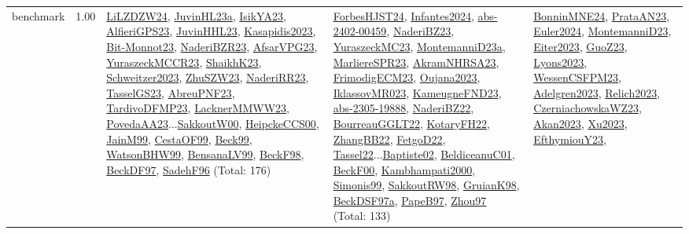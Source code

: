{\begin{longtable}{p{3cm}r>{\raggedright\arraybackslash}p{6cm}>{\raggedright\arraybackslash}p{6cm}>{\raggedright\arraybackslash}p{8cm}}
\index{benchmark}\index{Benchmarks!benchmark}benchmark &  1.00 & \hyperref[detail:LiLZDZW24]{LiLZDZW24}, \hyperref[detail:JuvinHL23a]{JuvinHL23a}, \hyperref[detail:IsikYA23]{IsikYA23}, \hyperref[detail:AlfieriGPS23]{AlfieriGPS23}, \hyperref[detail:JuvinHHL23]{JuvinHHL23}, \hyperref[detail:Kasapidis2023]{Kasapidis2023}, \hyperref[detail:Bit-Monnot23]{Bit-Monnot23}, \hyperref[detail:NaderiBZR23]{NaderiBZR23}, \hyperref[detail:AfsarVPG23]{AfsarVPG23}, \hyperref[detail:YuraszeckMCCR23]{YuraszeckMCCR23}, \hyperref[detail:ShaikhK23]{ShaikhK23}, \hyperref[detail:Schweitzer2023]{Schweitzer2023}, \hyperref[detail:ZhuSZW23]{ZhuSZW23}, \hyperref[detail:NaderiRR23]{NaderiRR23}, \hyperref[detail:TasselGS23]{TasselGS23}, \hyperref[detail:AbreuPNF23]{AbreuPNF23}, \hyperref[detail:TardivoDFMP23]{TardivoDFMP23}, \hyperref[detail:LacknerMMWW23]{LacknerMMWW23}, \hyperref[detail:PovedaAA23]{PovedaAA23}...\hyperref[detail:SakkoutW00]{SakkoutW00}, \hyperref[detail:HeipckeCCS00]{HeipckeCCS00}, \hyperref[detail:JainM99]{JainM99}, \hyperref[detail:CestaOF99]{CestaOF99}, \hyperref[detail:Beck99]{Beck99}, \hyperref[detail:WatsonBHW99]{WatsonBHW99}, \hyperref[detail:BensanaLV99]{BensanaLV99}, \hyperref[detail:BeckF98]{BeckF98}, \hyperref[detail:BeckDF97]{BeckDF97}, \hyperref[detail:SadehF96]{SadehF96} (Total: 176) & \hyperref[detail:ForbesHJST24]{ForbesHJST24}, \hyperref[detail:Infantes2024]{Infantes2024}, \hyperref[detail:abs-2402-00459]{abs-2402-00459}, \hyperref[detail:NaderiBZ23]{NaderiBZ23}, \hyperref[detail:YuraszeckMC23]{YuraszeckMC23}, \hyperref[detail:MontemanniD23a]{MontemanniD23a}, \hyperref[detail:MarliereSPR23]{MarliereSPR23}, \hyperref[detail:AkramNHRSA23]{AkramNHRSA23}, \hyperref[detail:FrimodigECM23]{FrimodigECM23}, \hyperref[detail:Oujana2023]{Oujana2023}, \hyperref[detail:IklassovMR023]{IklassovMR023}, \hyperref[detail:KameugneFND23]{KameugneFND23}, \hyperref[detail:abs-2305-19888]{abs-2305-19888}, \hyperref[detail:NaderiBZ22]{NaderiBZ22}, \hyperref[detail:BourreauGGLT22]{BourreauGGLT22}, \hyperref[detail:KotaryFH22]{KotaryFH22}, \hyperref[detail:ZhangBB22]{ZhangBB22}, \hyperref[detail:FetgoD22]{FetgoD22}, \hyperref[detail:Tassel22]{Tassel22}...\hyperref[detail:Baptiste02]{Baptiste02}, \hyperref[detail:BeldiceanuC01]{BeldiceanuC01}, \hyperref[detail:BeckF00]{BeckF00}, \hyperref[detail:Kambhampati2000]{Kambhampati2000}, \hyperref[detail:Simonis99]{Simonis99}, \hyperref[detail:SakkoutRW98]{SakkoutRW98}, \hyperref[detail:GruianK98]{GruianK98}, \hyperref[detail:BeckDSF97a]{BeckDSF97a}, \hyperref[detail:PapeB97]{PapeB97}, \hyperref[detail:Zhou97]{Zhou97} (Total: 133) & \hyperref[detail:BonninMNE24]{BonninMNE24}, \hyperref[detail:PrataAN23]{PrataAN23}, \hyperref[detail:Euler2024]{Euler2024}, \hyperref[detail:MontemanniD23]{MontemanniD23}, \hyperref[detail:Eiter2023]{Eiter2023}, \hyperref[detail:GuoZ23]{GuoZ23}, \hyperref[detail:Lyons2023]{Lyons2023}, \hyperref[detail:WessenCSFPM23]{WessenCSFPM23}, \hyperref[detail:Adelgren2023]{Adelgren2023}, \hyperref[detail:Relich2023]{Relich2023}, \hyperref[detail:CzerniachowskaWZ23]{CzerniachowskaWZ23}, \hyperref[detail:Akan2023]{Akan2023}, \hyperref[detail:Xu2023]{Xu2023}, \hyperref[detail:EfthymiouY23]{EfthymiouY23}, 
\end{longtable}}
